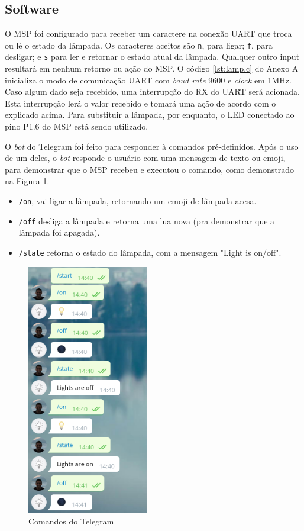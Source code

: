 \documentclass[12pt,journal,compsoc]{IEEEtran}
\begin{document}
\subsection{Software}

O MSP foi configurado para receber um caractere na conexão UART que troca ou lê o estado da lâmpada. Os caracteres aceitos são \texttt{n}, para ligar; \texttt{f}, para desligar; e \texttt{s} para ler e retornar o estado atual da lâmpada. Qualquer outro input resultará em nenhum retorno ou ação do MSP. O código \ref{lst:lamp.c} do Anexo A inicializa o modo de comunicação UART com \textit{baud rate} 9600 e \textit{clock} em 1MHz. Caso algum dado seja recebido, uma interrupção do RX do UART será acionada. Esta interrupção lerá o valor recebido e tomará uma ação de acordo com o explicado acima. Para substituir a lâmpada, por enquanto, o LED conectado ao pino P1.6 do MSP está sendo utilizado.


O \textit{bot} do Telegram foi feito para responder à comandos pré-definidos. Após o uso de um deles, o \textit{bot} responde o usuário com uma mensagem de texto ou emoji, para demonstrar que o MSP recebeu e executou o comando, como demonstrado na Figura \ref{fig:telegram}.

\begin{itemize}
\item \texttt{/on}, vai ligar a lâmpada, retornando um emoji de lâmpada acesa.
\item \texttt{/off} desliga a lâmpada e retorna uma lua nova (pra demonstrar que a lâmpada foi apagada).
\item \texttt{/state} retorna o estado do lâmpada, com a mensagem "Light is {on/off}".
\end{itemize}

\begin{figure}[h!]
\centering
\includegraphics[width=200px,height=\textheight,keepaspectratio]{telegram_commands}
\caption{Comandos do Telegram}
\label{fig:telegram}
\end{figure}
\end{document}
